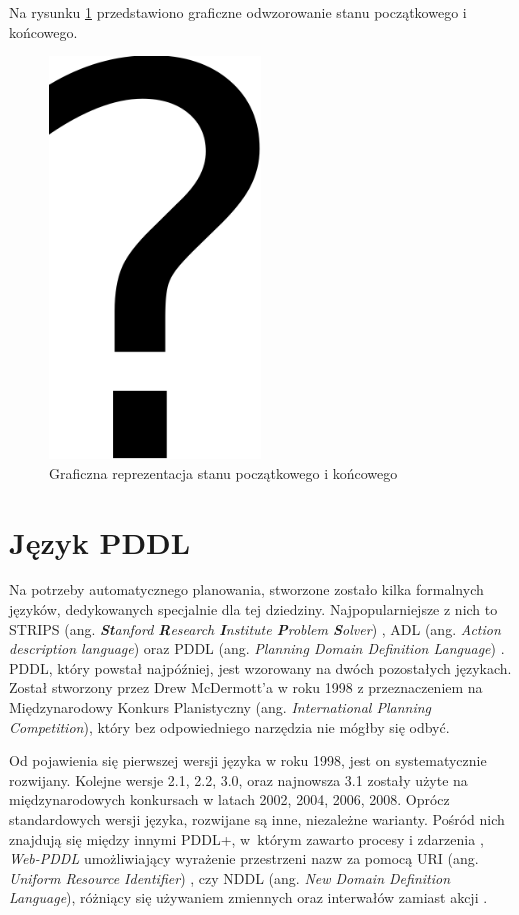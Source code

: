 Na rysunku \ref{fig:automatyczne-planowanie} przedstawiono graficzne odwzorowanie stanu początkowego i końcowego.
\begin{figure}[h!]
    \centering
    \includegraphics[width=0.5\textwidth]{img/rys2,1}
    \caption{Graficzna reprezentacja stanu początkowego i końcowego}
    \label{fig:automatyczne-planowanie}
\end{figure}


\section{Język PDDL}
\label{sec:jezykpddl}
Na potrzeby automatycznego planowania, stworzone zostało kilka formalnych języków, dedykowanych specjalnie dla tej dziedziny. Najpopularniejsze z nich to STRIPS (ang. \textit{\textbf{St}anford \textbf{R}esearch \textbf{I}nstitute \textbf{P}roblem \textbf{S}olver}) \cite{strips}, ADL (ang. \textit{Action description language}) \cite{adl} oraz PDDL (ang. \textit{Planning Domain Definition Language}) \cite{pddl}. PDDL, który powstał najpóźniej, jest wzorowany na dwóch pozostałych językach. Został stworzony przez Drew McDermott'a w roku 1998 z przeznaczeniem na Międzynarodowy Konkurs Planistyczny (ang. \textit{International Planning Competition}), który bez odpowiedniego narzędzia nie mógłby się odbyć.

Od pojawienia się pierwszej wersji języka w roku 1998, jest on systematycznie rozwijany. Kolejne wersje 2.1, 2.2, 3.0, oraz najnowsza 3.1 zostały użyte na międzynarodowych konkursach w latach 2002, 2004, 2006, 2008. Oprócz standardowych wersji języka, rozwijane są inne, niezależne warianty. Pośród nich znajdują się między innymi PDDL+, w~którym zawarto procesy i zdarzenia \cite{pddlplus}, \emph{Web-PDDL} umożliwiający wyrażenie przestrzeni nazw za pomocą URI (ang. \textit{Uniform Resource Identifier}) \cite{webpddl}, czy NDDL (ang. \textit{New Domain Definition Language}), różniący się używaniem zmiennych oraz interwałów zamiast akcji \cite{npdl}.

